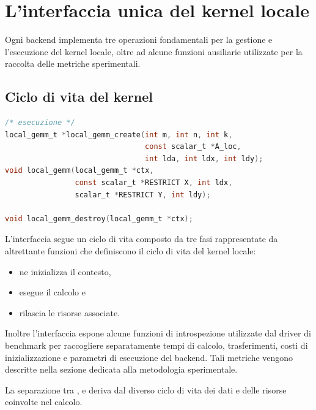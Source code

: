 
\section{L'interfaccia unica del kernel locale}
\label{sec:interfaccia}

Ogni backend implementa tre operazioni fondamentali per la gestione e l'esecuzione del kernel locale, oltre ad alcune funzioni ausiliarie utilizzate per la raccolta delle metriche sperimentali.

\subsection{Ciclo di vita del kernel}\label{sec:tre-fasi}

\begin{lstlisting}[language=C,caption={Interfaccia di \file{src/kernel/kernel.h}.}]
/* esecuzione */
local_gemm_t *local_gemm_create(int m, int n, int k,
                                const scalar_t *A_loc,
                                int lda, int ldx, int ldy);
void local_gemm(local_gemm_t *ctx,
                const scalar_t *RESTRICT X, int ldx,
                scalar_t *RESTRICT Y, int ldy);

void local_gemm_destroy(local_gemm_t *ctx);

\end{lstlisting}

L'interfaccia segue un ciclo di vita composto da tre fasi rappresentate da altrettante funzioni che definiscono il ciclo di vita del kernel locale:
\begin{itemize}
    \item {} ne inizializza il contesto,
    \item {} esegue il calcolo e
    \item {} rilascia le risorse associate.
\end{itemize}


\color{black}


Inoltre l'interfaccia espone alcune funzioni di introspezione utilizzate dal driver di
benchmark per raccogliere separatamente tempi di calcolo, trasferimenti, costi di
inizializzazione e parametri di esecuzione del backend. Tali metriche vengono descritte nella sezione dedicata alla metodologia sperimentale.

La separazione tra ,  e
 deriva dal diverso ciclo di vita dei dati
e delle risorse coinvolte nel calcolo.

